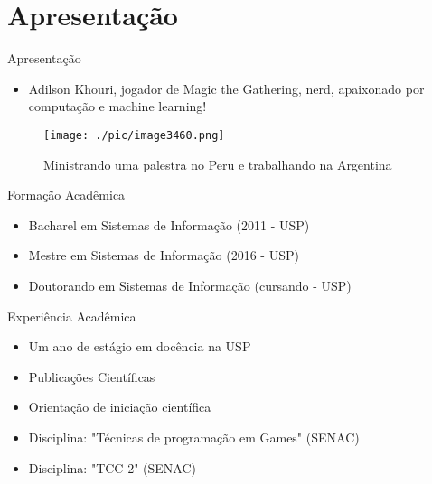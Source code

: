 \section{Apresentação}

\begin{frame}	
	\begin{block}{Apresentação}	
		\begin{itemize}
			\item Adilson Khouri,  jogador de Magic the Gathering, nerd, apaixonado por computação e machine learning!
		\end{itemize}
		 \begin{figure}[!htb]
			\centering	  				
			\texttt{[image: ./pic/image3460.png]}
			\caption{Ministrando uma palestra no Peru e trabalhando na Argentina}
			\label{fig_adilson_argentina}
		\end{figure}
	\end{block}
\end{frame}
			
\begin{frame}	
	\begin{block}{Formação Acadêmica}
		 \begin{itemize}
			  \item Bacharel em Sistemas de Informação (2011 - USP)
			  \item Mestre em Sistemas de Informação (2016 - USP)
			  \item Doutorando em Sistemas de Informação (cursando - USP)
		  \end{itemize}
	\end{block}
\end{frame}

\begin{frame}	
	\begin{block}{Experiência Acadêmica}
		 \begin{itemize}
			  \item Um ano de estágio em docência na USP
			  \item Publicações Científicas
			  \item Orientação de iniciação científica
			  \item Disciplina: "Técnicas de programação em Games" (SENAC)
			  \item Disciplina: "TCC 2"	(SENAC)
		  \end{itemize}
	\end{block}
\end{frame}

